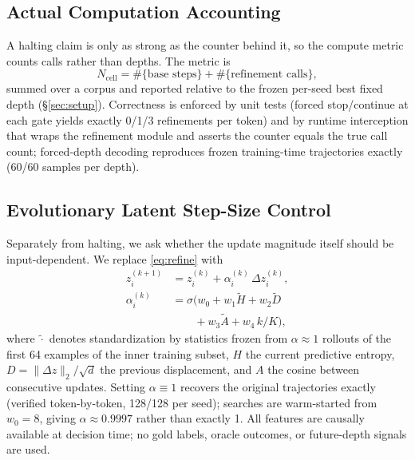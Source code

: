 \documentclass[11pt]{article}
\begin{document}
\subsection{Actual Computation Accounting}
\label{sec:ncell}
A halting claim is only as strong as the counter behind it, so the compute metric counts calls rather than depths. The metric is
\begin{equation}
N_{\mathrm{cell}} = \#\{\text{base steps}\} + \#\{\text{refinement calls}\},
\label{eq:ncell}
\end{equation}
summed over a corpus and reported relative to the frozen per-seed best fixed depth (\S\ref{sec:setup}). Correctness is enforced by unit tests (forced stop/continue at each gate yields exactly 0/1/3 refinements per token) and by runtime interception that wraps the refinement module and asserts the counter equals the true call count; forced-depth decoding reproduces frozen training-time trajectories exactly (60/60 samples per depth).

\subsection{Evolutionary Latent Step-Size Control}
\label{sec:alpha}
Separately from halting, we ask whether the update magnitude itself should be input-dependent. We replace \eqref{eq:refine} with
\begin{equation}
\begin{aligned}
z_i^{(k+1)} &= z_i^{(k)} + \alpha_i^{(k)}\,\Delta z_i^{(k)},\\
\alpha_i^{(k)} &= \sigma\!\big(w_0 + w_1 \tilde H + w_2 \tilde D\\
 &\qquad + w_3 \tilde A + w_4\, k/K\big),
\end{aligned}
\label{eq:alpha}
\end{equation}
where $\tilde\cdot$ denotes standardization by statistics frozen from $\alpha{\approx}1$ rollouts of the first 64 examples of the inner training subset, $H$ the current predictive entropy, $D = \lVert\Delta z\rVert_2/\sqrt{d}$ the previous displacement, and $A$ the cosine between consecutive updates. Setting $\alpha \equiv 1$ recovers the original trajectories exactly (verified token-by-token, 128/128 per seed); searches are warm-started from $w_0 = 8$, giving $\alpha \approx 0.9997$ rather than exactly 1. All features are causally available at decision time; no gold labels, oracle outcomes, or future-depth signals are used.
\end{document}
